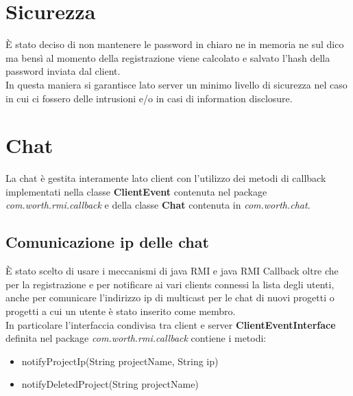 \documentclass[11pt]{report}
\begin{document}
	\section{Sicurezza}
	È stato deciso di non mantenere le password in chiaro ne in memoria ne sul dico ma bensì al momento della registrazione viene calcolato e salvato l'hash della password inviata dal client.\\
	In questa maniera si garantisce lato server un minimo livello di sicurezza nel caso in cui ci fossero delle intrusioni e/o in casi di information disclosure. 
	
	\section{Chat}
	La chat è gestita interamente lato client con l'utilizzo dei metodi di callback implementati nella classe \textbf{ClientEvent} contenuta nel package \textit{com.worth.rmi.callback} e della classe \textbf{Chat} contenuta in \textit{com.worth.chat}. \\
	
	\subsection{Comunicazione ip delle chat}
	È stato scelto di usare i meccanismi di java RMI e java RMI Callback oltre che per la registrazione e per notificare ai vari clients connessi la lista degli utenti, anche per comunicare l'indirizzo ip di multicast per le chat di nuovi progetti o progetti a cui un utente è stato inserito come membro.\\
	In particolare l'interfaccia condivisa tra client e server \textbf{ClientEventInterface} definita nel package \textit{com.worth.rmi.callback} contiene i metodi:
	
		\begin{itemize}
			\item notifyProjectIp(String projectName, String ip) 
			\item notifyDeletedProject(String projectName)
		\end{itemize}
\end{document}
